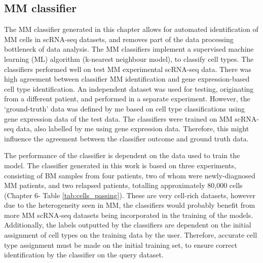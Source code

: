 \subsection{MM classifier}\label{subsec:mm_class_diss}
The MM classifier generated in this chapter allows for automated identification of MM cells in scRNA-seq datasets, and removes part of the data processing bottleneck of data analysis.
The MM classifiers implement a supervised machine learning (ML) algorithm (k-nearest neighbour model), to classify cell types.
The classifiers performed well on test MM experimental scRNA-seq data.
There was high agreement between classifier MM identification and gene expression-based cell type identification.
An independent dataset was used for testing, originating from a different patient, and performed in a separate experiment.
However, the `ground-truth' data was defined by me based on cell type classifications using gene expression data of the test data.
The classifiers were trained on MM scRNA-seq data, also labelled by me using gene expression data.
Therefore, this might influence the agreement between the classifier outcome and ground truth data.

The performance of the classifier is dependent on the data used to train the model.
The classifier generated in this work is based on three experiments, consisting of BM samples from four patients, two of whom were newly-diagnosed MM patients, and two relapsed patients, totalling approximately 80,000 cells (Chapter 6- Table \ref{tab:cells_passing}).
These are very cell-rich datasets, however due to the heterogeneity seen in MM, the classifiers would probably benefit from more MM scRNA-seq datasets being incorporated in the training of the models.
Additionally, the labels outputted by the classifiers are dependent on the initial assignment of cell types on the training data by the user.
Therefore, accurate cell type assignment must be made on the initial training set, to ensure correct identification by the classifier on the query dataset.

